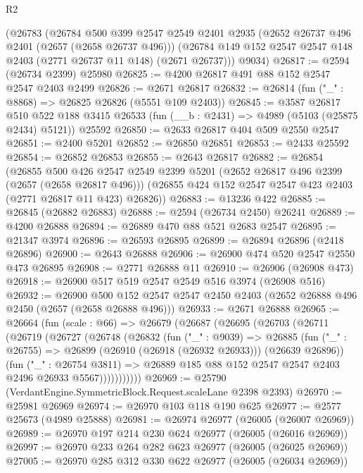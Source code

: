 \begin{lexlean}{R2}
\begin{coremodule}
    (@26783
      (@26784
        @500
        @399
        @2547
        @2549
        @2401
        @2935
        (@2652 @26737 @496 @2401 (@2657 (@2658 @26737 @496)))
        (@26784 @149 @152 @2547 @2547 @148 @2403 (@2771 @26737 @11 @148) (@2671 @26737)))
      @9034)
@26817 := @2594 (@26734 @2399) @25980
@26825 := @4200 @26817 @491 @88 @152 @2547 @2547 @2403 @2499
@26826 := @2671 @26817
@26832 := @26814 (fun ("_" : @8868) => @26825 @26826 (@5551 @109 @2403))
@26845 := @3587
    @26817
    @510
    @522
    @188
    @3415
    @26533
    (fun (__b : @2431) => @4989 (@5103 (@25875 @2434) @5121))
    @25592
@26850 := @2633 @26817 @404 @509 @2550 @2547
@26851 := @2400 @5201
@26852 := @26850 @26851
@26853 := @2433 @25592
@26854 := @26852 @26853
@26855 := @2643 @26817
@26882 := @26854
    (@26855
      @500
      @426
      @2547
      @2549
      @2399
      @5201
      (@2652 @26817 @496 @2399 (@2657 (@2658 @26817 @496)))
      (@26855 @424 @152 @2547 @2547 @423 @2403 (@2771 @26817 @11 @423) @26826))
@26883 := @13236 @422
@26885 := @26845 (@26882 @26883)
@26888 := @2594 (@26734 @2450) @26241
@26889 := @4200 @26888
@26894 := @26889 @470 @88 @521 @2683 @2547
@26895 := @21347 @3974
@26896 := @26593 @26895
@26899 := @26894 @26896 (@2418 @26896)
@26900 := @2643 @26888
@26906 := @26900 @474 @520 @2547 @2550 @473 @26895
@26908 := @2771 @26888 @11
@26910 := @26906 (@26908 @473)
@26918 := @26900 @517 @519 @2547 @2549 @516 @3974 (@26908 @516)
@26932 := @26900
    @500
    @152
    @2547
    @2547
    @2450
    @2403
    (@2652 @26888 @496 @2450 (@2657 (@2658 @26888 @496)))
@26933 := @2671 @26888
@26965 := @26664
    (fun (scale : @66) =>
    @26679
      (@26687
        (@26695
          (@26703
            (@26711
              (@26719
                (@26727
                  (@26748
                    (@26832
                      (fun ("_" : @9039) =>
                      @26885
                        (fun ("_" : @26755) =>
                        @26899 (@26910 (@26918 (@26932 @26933))) (@26639 @26896))
                        (fun ("_" : @26754 @3811) =>
                        @26889 @185 @88 @152 @2547 @2547 @2403 @2496 @26933 @5567)))))))))))
@26969 := @25790 (VerdantEngine.SymmetricBlock.Request.scaleLane @2398 @2393)
@26970 := @25981 @26969
@26974 := @26970 @103 @118 @190 @625
@26977 := @2577 @25673 (@4989 @25888)
@26981 := @26974 @26977 (@26005 (@26007 @26969))
@26989 := @26970 @197 @214 @230 @624 @26977 (@26005 (@26016 @26969))
@26997 := @26970 @233 @264 @282 @623 @26977 (@26005 (@26025 @26969))
@27005 := @26970 @285 @312 @330 @622 @26977 (@26005 (@26034 @26969))

\end{coremodule}
\end{lexlean}
